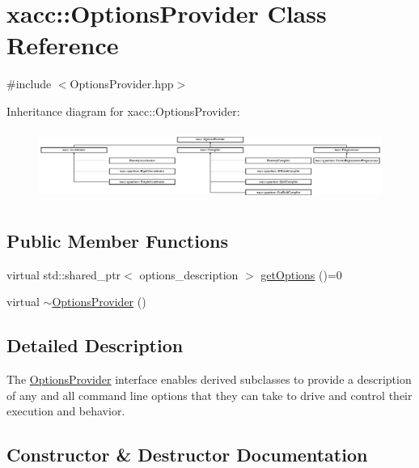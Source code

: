 \hypertarget{a01543}{}\section{xacc\+:\+:Options\+Provider Class Reference}
\label{a01543}


{\ttfamily \#include $<$Options\+Provider.\+hpp$>$}

Inheritance diagram for xacc\+:\+:Options\+Provider\+:\begin{figure}[H]
\begin{center}
\leavevmode
\includegraphics[height=2.309278cm]{a01543}
\end{center}
\end{figure}
\subsection*{Public Member Functions}
\begin{DoxyCompactItemize}
\item 
virtual std\+::shared\+\_\+ptr$<$ options\+\_\+description $>$ \hyperlink{a01543_a6d150954f852109bfe2c1ae90222926f}{get\+Options} ()=0
\item 
virtual \hyperlink{a01543_a7782757b419792ff346f563517eed8b8}{$\sim$\+Options\+Provider} ()
\end{DoxyCompactItemize}


\subsection{Detailed Description}
The \hyperlink{a01543}{Options\+Provider} interface enables derived subclasses to provide a description of any and all command line options that they can take to drive and control their execution and behavior. 

\subsection{Constructor \& Destructor Documentation}
\mbox{\label{a01543_a7782757b419792ff346f563517eed8b8}} 
